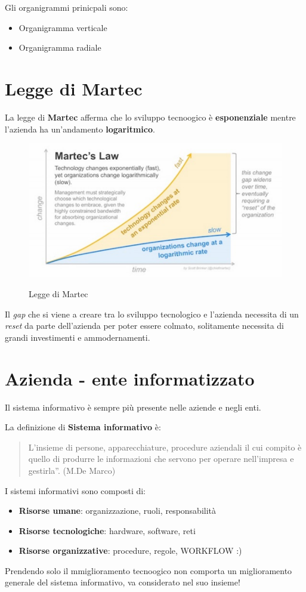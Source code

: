 Gli organigrammi prinicpali sono:
\begin{itemize}
  \item Organigramma verticale
  \item Organigramma radiale
\end{itemize}


\section{Legge di Martec}
La legge di \textbf{Martec} afferma che lo sviluppo tecnoogico \`e \textbf{esponenziale} 
mentre l'azienda ha un'andamento \textbf{logaritmico}.

\begin{figure}[!ht]
  \centering
  \includegraphics[width=0.7\linewidth]{images/martec.png}
  \label{fig:martec}
  \caption{Legge di Martec}
\end{figure}

Il \textit{gap} che si viene a creare tra lo sviluppo tecnologico e l'azienda necessita di un \textit{reset} da 
parte dell'azienda per poter essere colmato, solitamente necessita di grandi investimenti e ammodernamenti.

\section{Azienda - ente informatizzato}
Il sistema informativo è sempre più presente nelle aziende e negli enti.

La definizione di \textbf{Sistema informativo} è:
\begin{quote}
L’insieme di persone, apparecchiature, procedure aziendali il cui compito è quello
di produrre le informazioni che servono per operare nell’impresa e gestirla”.
(M.De Marco)
\end{quote}




I sistemi informativi sono composti di:
\begin{itemize}
  \item \textbf{Risorse umane}: organizzazione, ruoli, responsabilità
  \item \textbf{Risorse tecnologiche}: hardware, software, reti
  \item \textbf{Risorse organizzative}: procedure, regole, WORKFLOW :)
\end{itemize}

Prendendo solo il mmiglioramento tecnoogico non comporta un miglioramento generale
del sistema informativo, va considerato nel suo insieme!


